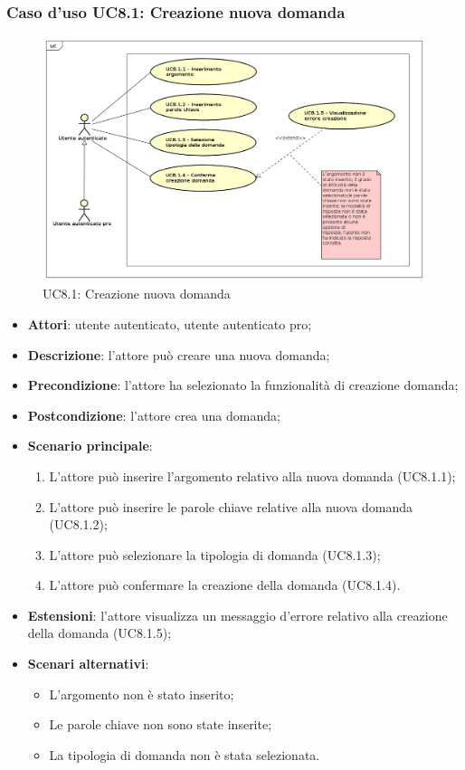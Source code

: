 \subsubsection{Caso d'uso UC8.1: Creazione nuova domanda}
	\label{UC8.1}
	\begin{figure}[h]
		\centering
			\includegraphics[scale=0.45,keepaspectratio]{UML/UC8_1.png}
		\caption{UC8.1: Creazione nuova domanda}
	\end{figure}
	\FloatBarrier
	\begin{itemize}
		\item
			\textbf{Attori}: utente autenticato, utente autenticato pro;
		\item		
			\textbf{Descrizione}: l'attore può creare una nuova domanda;
		\item
			\textbf{Precondizione}: l'attore ha selezionato la funzionalità di creazione domanda;
		\item
			\textbf{Postcondizione}: l'attore crea una domanda;		
		\item
			\textbf{Scenario principale}:
	       		\begin{enumerate}
					\item
					L'attore può inserire l'argomento relativo alla nuova domanda (UC8.1.1);
					\item
					L'attore può inserire le parole chiave relative alla nuova domanda (UC8.1.2);
					\item
					L'attore può selezionare la tipologia di domanda (UC8.1.3);
					\item
					L'attore può confermare la creazione della domanda (UC8.1.4).
	 			\end{enumerate}
	 	\item
			\textbf{Estensioni}: l'attore visualizza un messaggio d'errore relativo alla creazione della domanda (UC8.1.5);
	 	\item
	 		\textbf{Scenari alternativi}:
				\begin{itemize}
					\item 	
						L'argomento non è stato inserito;
					\item
						Le parole chiave non sono state inserite;
					\item
						La tipologia di domanda non è stata selezionata.	
				\end{itemize}
	\end{itemize}
